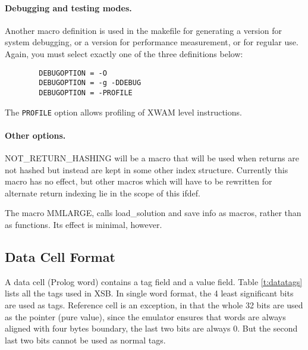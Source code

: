 \documentclass[11pt]{article}
\begin{document}
\paragraph{Debugging and testing modes. }
Another macro definition is used in the makefile
for generating a version for system debugging, or a version
for performance measurement, or for regular use.
Again, you must select exactly one of the three definitions below:

\begin{verbatim}
        DEBUGOPTION = -O
        DEBUGOPTION = -g -DDEBUG
        DEBUGOPTION = -PROFILE
\end{verbatim}

The {\tt PROFILE} option allows profiling of XWAM level instructions.


\paragraph{Other options. }

NOT\_RETURN\_HASHING will be a macro that will be used when returns are
not hashed but instead are kept in some other index structure.
Currently this macro has no effect, but other macros which will have
to be rewritten for alternate return indexing lie in the scope of this
ifdef.

The macro MMLARGE, calls load\_solution and save info as macros, rather
than as functions.  Its effect is minimal, however.

\subsection{Data Cell Format}

A data cell (Prolog word) contains a tag field and a value field.
Table \ref{t:datatags} lists all the tags used in XSB.
In single word format, the 4 least significant bits are used
as tags. Reference cell is an exception, in that the whole 32 bits
are used as the pointer (pure value), since the emulator ensures that
words are always aligned with four bytes boundary, the last two bits
are always 0. But the second last two bits cannot be used as normal tags.
\end{document}
